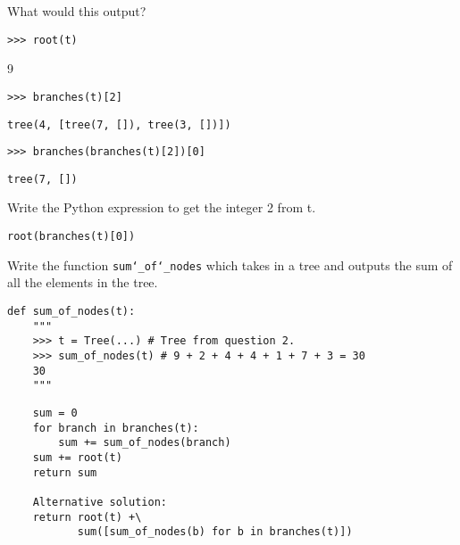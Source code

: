 \documentclass{exam}
\begin{document}
\begin{questions}
\begin{blocksection}
\question What would this output?

\begin{lstlisting}
>>> root(t)
\end{lstlisting}
\begin{solution}[.25in]
9
\end{solution}

\begin{lstlisting}
>>> branches(t)[2]
\end{lstlisting}
\begin{solution}[.25in]
\begin{lstlisting}
tree(4, [tree(7, []), tree(3, [])])
\end{lstlisting}
\end{solution}

\begin{lstlisting}
>>> branches(branches(t)[2])[0]
\end{lstlisting}
\begin{solution}[.25in]
\begin{lstlisting}
tree(7, [])
\end{lstlisting}
\end{solution}
\end{blocksection}

\begin{blocksection}
\question Write the Python expression to get the integer 2 from t.

\begin{solution}[0.25in]
\begin{lstlisting}
root(branches(t)[0])
\end{lstlisting}
\end{solution}

\end{blocksection}

\begin{blocksection}
\question Write the function \texttt{sum\char`_of\char`_nodes} which takes in a
tree and outputs the sum of all the elements in the tree.
\end{blocksection}

\begin{lstlisting}
def sum_of_nodes(t):
    """
    >>> t = Tree(...) # Tree from question 2.
    >>> sum_of_nodes(t) # 9 + 2 + 4 + 4 + 1 + 7 + 3 = 30
    30
    """
\end{lstlisting}
\begin{solution}[4in]
\begin{lstlisting}
    sum = 0
    for branch in branches(t):
        sum += sum_of_nodes(branch)
    sum += root(t)
    return sum

    Alternative solution:
    return root(t) +\
           sum([sum_of_nodes(b) for b in branches(t)])
\end{lstlisting}
\end{solution}

\end{questions}

\end{document}
